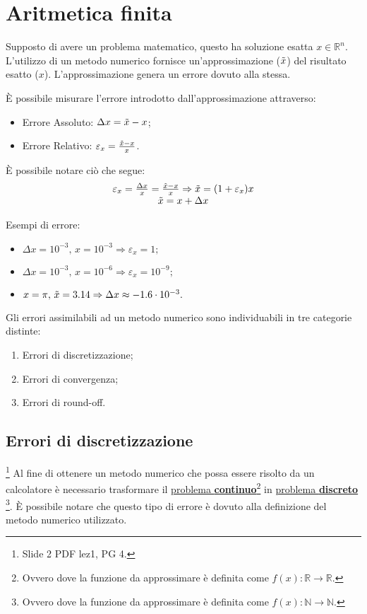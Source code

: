 \section{Aritmetica finita}
Supposto di avere un problema matematico, questo ha soluzione esatta $x \in\mathbb R^n$. L'utilizzo di un metodo numerico fornisce un'approssimazione ($\Tilde{x}$) del risultato esatto ($x$). L'approssimazione genera un errore dovuto alla stessa.

È possibile misurare l'errore introdotto dall'approssimazione attraverso:
\begin{itemize}
	\item Errore Assoluto: $\Delta x = \Tilde{x}-x$;
	\item Errore Relativo: $\varepsilon_x=\frac{\Tilde{x}-x}{x}$. 
\end{itemize}

È possibile notare ciò che segue:
\begin{equation*}
	\begin{matrix}
		\varepsilon_x=\frac{\Delta x}{x}=\frac{\Tilde{x}-x}{x}\Rightarrow \Tilde{x}=(1+\varepsilon_x)x\\
		\Tilde{x}=x+\Delta x
	\end{matrix}
\end{equation*}

Esempi di errore:
\begin{itemize}
	\item $\Delta x = 10^{-3},\, x=10^{-3}\Rightarrow \varepsilon_x = 1;$
	\item  $\Delta x = 10^{-3},\, x=10^{-6}\Rightarrow\varepsilon_x = 10^{-9};$
	\item $x=\pi,\,\Tilde{x}=3.14 \Rightarrow\Delta x \approx -1.6\cdot 10^{-3}.$
\end{itemize}

Gli errori assimilabili ad un metodo numerico sono individuabili in tre categorie distinte:
\begin{enumerate}
	\item Errori di discretizzazione;
	\item Errori di convergenza;
	\item Errori di round-off.
\end{enumerate}

\subsection{Errori di discretizzazione}\footnote{Slide 2 PDF lez1, PG 4.}
Al fine di ottenere un metodo numerico che possa essere risolto da un calcolatore è necessario trasformare il \underline{problema \textbf{continuo}}\footnote{Ovvero dove la funzione da approssimare è definita come $f(x):\mathbb R\rightarrow\mathbb R$.} in \underline{problema \textbf{discreto}} \footnote{Ovvero dove la funzione da approssimare è definita come $f(x):\mathbb N\rightarrow\mathbb N$.}. È possibile notare che questo tipo di errore è dovuto alla definizione del metodo numerico utilizzato.

